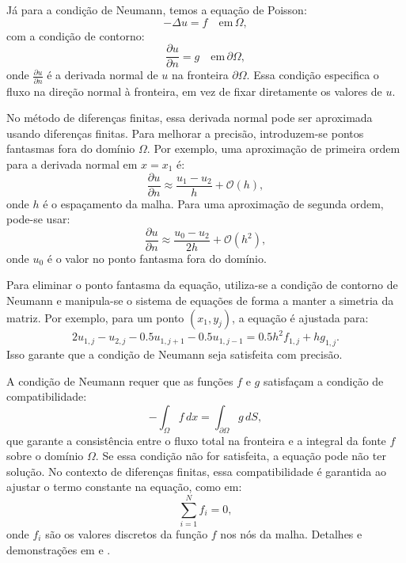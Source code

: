 \documentclass[column,amsmath,amssymb,floatfix]{revtex4}
\begin{document}
            Já para a condição de Neumann, temos a equação de Poisson:
            \begin{equation*}
                -\Delta u = f \quad \text{em} \, \Omega,
            \end{equation*}
            com a condição de contorno:
            \begin{equation*}
                \frac{\partial u}{\partial n} = g \quad \text{em} \, \partial \Omega,
            \end{equation*}
            onde $\frac{\partial u}{\partial n}$ é a derivada normal de $u$ na fronteira $\partial \Omega$. Essa condição especifica o fluxo na direção normal à fronteira, em vez de fixar diretamente os valores de $u$.
            
            No método de diferenças finitas, essa derivada normal pode ser aproximada usando diferenças finitas. Para melhorar a precisão, introduzem-se pontos fantasmas fora do domínio $\Omega$. Por exemplo, uma aproximação de primeira ordem para a derivada normal em $x = x_1$ é:
            \begin{equation*}
                \frac{\partial u}{\partial n} \approx \frac{u_1 - u_2}{h} + \mathcal{O}(h),
            \end{equation*}
            onde $h$ é o espaçamento da malha. Para uma aproximação de segunda ordem, pode-se usar:
            \begin{equation*}
                \frac{\partial u}{\partial n} \approx \frac{u_0 - u_2}{2h} + \mathcal{O}(h^2),
            \end{equation*}
            onde $u_0$ é o valor no ponto fantasma fora do domínio.
            
            Para eliminar o ponto fantasma da equação, utiliza-se a condição de contorno de Neumann e manipula-se o sistema de equações de forma a manter a simetria da matriz. Por exemplo, para um ponto $(x_1, y_j)$, a equação é ajustada para:
            \begin{equation*}
                2u_{1,j} - u_{2,j} - 0.5u_{1,j+1} - 0.5u_{1,j-1} = 0.5h^2 f_{1,j} + h g_{1,j}.
            \end{equation*}
            Isso garante que a condição de Neumann seja satisfeita com precisão.
            
            A condição de Neumann requer que as funções $f$ e $g$ satisfaçam a condição de compatibilidade:
            \begin{equation*}
                -\int_\Omega f \, dx = \int_{\partial \Omega} g \, dS,
            \end{equation*}
            que garante a consistência entre o fluxo total na fronteira e a integral da fonte $f$ sobre o domínio $\Omega$. Se essa condição não for satisfeita, a equação pode não ter solução. No contexto de diferenças finitas, essa compatibilidade é garantida ao ajustar o termo constante na equação, como em:
            \begin{equation*}
                \sum_{i=1}^{N} f_i = 0,
            \end{equation*}
            onde $f_i$ são os valores discretos da função $f$ nos nós da malha. Detalhes e demonstrações em \cite{Chen2014} e \cite{Butler2021}.
\end{document}
